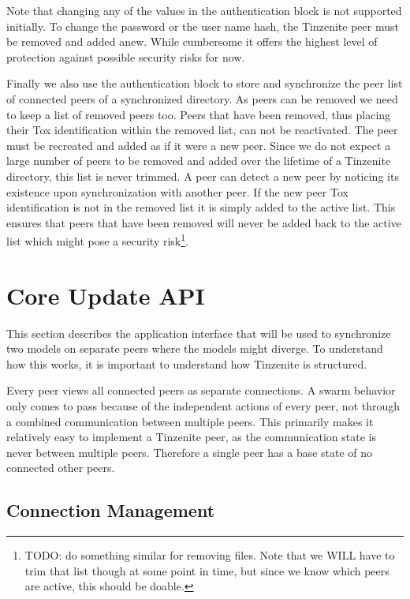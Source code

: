 Note that changing any of the values in the authentication block is not supported initially.
To change the password or the user name hash, the Tinzenite peer must be removed and added anew.
While cumbersome it offers the highest level of protection against possible security risks for now.

Finally we also use the authentication block to store and synchronize the peer list of connected peers of a synchronized directory.
As peers can be removed we need to keep a list of removed peers too.
Peers that have been removed, thus placing their Tox identification within the removed list, can not be reactivated.
The peer must be recreated and added as if it were a new peer.
Since we do not expect a large number of peers to be removed and added over the lifetime of a Tinzenite directory, this list is never trimmed.
A peer can detect a new peer by noticing its existence upon synchronization with another peer.
If the new peer Tox identification is not in the removed list it is simply added to the active list.
This ensures that peers that have been removed will never be added back to the active list which might pose a security risk\footnote{TODO: do something similar for removing files. Note that we WILL have to trim that list though at some point in time, but since we know which peers are active, this should be doable.}.

\section{Core Update API}
\label{sec:Core Update API}

This section describes the application interface that will be used to synchronize two models on separate peers where the models might diverge.
To understand how this works, it is important to understand how Tinzenite is structured.

Every peer views all connected peers as separate connections.
A swarm behavior only comes to pass because of the independent actions of every peer, not through a combined communication between multiple peers.
This primarily makes it relatively easy to implement a Tinzenite peer, as the communication state is never between multiple peers.
Therefore a single peer has a base state of no connected other peers.

\subsection{Connection Management}
\label{sec:conn_management}

